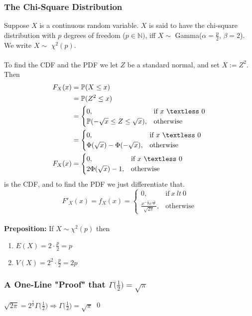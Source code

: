 \documentclass{article}
\newcommand{\N}{\mathbb{N}}
\newcommand{\bbP}{\mathbb{P}}
\newcommand{\lt}{\textless}
\newcommand{\imply}{\Rightarrow}
\newcommand{\x}{\cdot}
\newcommand{\Ga}{\Gamma}
\newcommand{\al}{\alpha}
\newcommand{\be}{\beta}
\begin{document}
\subsubsection{The Chi-Square Distribution}
Suppose $X$ is a continuous random variable. $X$ is said to have the chi-square distribution with $p$ degrees of freedom ($p \in \N)$, iff $X \sim$ Gamma($\al = \frac{p}{2}$, $\be = 2$). We write $X \sim$ $\chi^{2}(p)$.\\\\
To find the CDF and the PDF we let $Z$ be a standard normal, and set $X := Z^2$. Then
\begin{align*}
	F_{X}(x) &= \bbP(X \leq x)\\
			&= \bbP(Z^{2} \leq x)\\
			&=
				\begin{cases}
					0, &\text{if}\ x\ \lt\ 0\\
					\bbP(-\sqrt{x} \leq Z \leq \sqrt{x}), &\text{otherwise}
				\end{cases}\\
			&=
				\begin{cases}
					0, &\text{if}\ x\ \lt\ 0\\
					\Phi(\sqrt{x}) - \Phi(-\sqrt{x}), &\text{otherwise}
				\end{cases}\\
	F_{X}(x)	&=
				\begin{cases}
					0, &\text{if}\ x\ \lt\ 0\\
					2\Phi(\sqrt{x}) -1, &\text{otherwise}
				\end{cases}
\end{align*}
is the CDF, and to find the PDF we just differentiate that.
\[	
	F'_{X}(x) = f_{X}(x) =
\begin{cases}
	0, &\text{if}\ x\ lt\ 0\\
	\frac{x^{-\frac{1}{2}}e^{\frac{-x}{2}}}{\sqrt{2 \pi}}, &\text{otherwise}
\end{cases}
\]\\
\textbf{Preposition:} If $X \sim \chi^{2}(p)$ then
\begin{enumerate}
	\item $E(X) = 2\x \frac{p}{2} = p$
	\item $V(X) = 2^2\x \frac{p}{2} = 2p$
\end{enumerate}
\subsubsection{A One-Line "Proof" that $\Ga\big(\frac{1}{2}\big) = \sqrt{\pi}$}
$\sqrt{2\pi} = 2^{\frac{1}{2}}\Ga\big(\frac{1}{2}\big) \imply \Ga\big(\frac{1}{2}\big) = \sqrt{\pi}$
\qed
\end{document}
